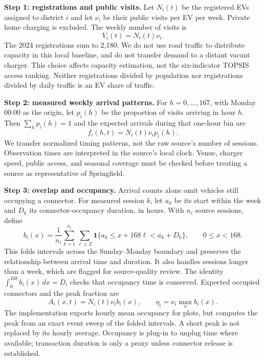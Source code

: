 \documentclass[12pt]{article}
\begin{document}
\textbf{Step 1: registrations and public visits.} Let $N_i(t)$ be the registered EVs
assigned to district $i$ and let $\nu_i$ be their public visits per EV per week.
Private home charging is excluded. The weekly number of visits is
\begin{equation}
V_i(t)=N_i(t)\nu_i.
\end{equation}
The 2024 registrations sum to 2,180. We do not use road traffic to distribute capacity
in this local baseline, and do not transfer demand to a distant vacant charger.
This choice affects capacity estimation, not the six-indicator TOPSIS access ranking.
Neither registrations divided by population nor registrations divided by daily traffic
is an EV share of traffic.

\textbf{Step 2: measured weekly arrival patterns.} For $h=0,\ldots,167$, with Monday
00:00 as the origin, let $p_i(h)$ be the proportion of visits arriving in hour $h$.
Then $\sum_h p_i(h)=1$ and the expected arrivals during that one-hour bin are
\begin{equation}
f_i(h,t)=N_i(t)\nu_i p_i(h).
\end{equation}
We transfer normalized timing patterns, not the raw source's number of sessions.
Observation times are interpreted in the source's local clock. Venue, charger speed,
public access, and seasonal coverage must be checked before treating a source as
representative of Springfield.

\textbf{Step 3: overlap and occupancy.} Arrival counts alone omit vehicles still
occupying a connector. For measured session $k$, let $a_k$ be its start within the week
and $D_k$ its connector-occupancy duration, in hours. With $n_i$ source sessions, define
\begin{equation}
b_i(x)=\frac{1}{n_i}\sum_{k=1}^{n_i}\sum_{\ell\in\mathbb Z}
\mathbf{1}\{a_k\le x+168\ell<a_k+D_k\},\qquad 0\le x<168.
\label{eq:foldedoccupancy}
\end{equation}
This folds intervals across the Sunday--Monday boundary and preserves the relationship
between arrival time and duration. It also handles sessions longer than a week, which
are flagged for source-quality review. The identity
$\int_0^{168}b_i(x)\,dx=\overline D_i$ checks that occupancy time is conserved.
Expected occupied connectors and the peak fraction are
\begin{equation}
A_i(x,t)=N_i(t)\nu_i b_i(x),\qquad
\eta_i=\nu_i\max_x b_i(x).
\end{equation}
The implementation exports hourly mean occupancy for plots, but computes the peak from
an exact event sweep of the folded intervals. A short peak is not replaced by its hourly
average. Occupancy is plug-in to unplug time where available; transaction duration is
only a proxy unless connector release is established.
\end{document}
